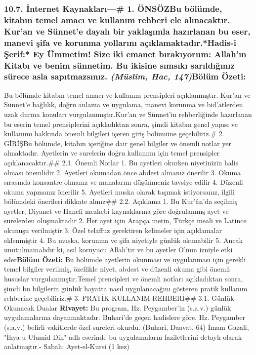 \documentclass[12pt,a4paper]{article}
\begin{document}
\subsubsection{10.7. İnternet Kaynakları---\# 1. ÖNSÖZBu bölümde, kitabın temel amacı ve kullanım rehberi ele alınacaktır. Kur'an ve Sünnet'e dayalı bir yaklaşımla hazırlanan bu eser, manevi şifa ve korunma yollarını açıklamaktadır.*Hadis-i Şerif:* Ey Ümmetim! Size iki emanet bırakıyorum: Allah'ın Kitabı ve benim sünnetim. Bu ikisine sımsıkı sarıldığınız sürece asla sapıtmazsınız. \textit{(Müslim, Hac, 147)}\textbf{Bölüm Özeti:}}
Bu bölümde kitabın temel amacı ve kullanım prensipleri açıklanmıştır. Kur'an ve Sünnet'e bağlılık, doğru anlama ve uygulama, manevi korunma ve bid'atlerden uzak durma konuları vurgulanmıştır.Kur'an ve Sünnet'in rehberliğinde hazırlanan bu eserin temel prensiplerini açıkladıktan sonra, şimdi kitabın genel yapısı ve kullanımı hakkında önemli bilgileri içeren giriş bölümüne geçebiliriz.\# 2. GİRİŞBu bölümde, kitabın içeriğine dair genel bilgiler ve önemli notlar yer almaktadır. Ayetlerin ve surelerin doğru kullanımı için temel prensipler açıklanacaktır.\#\# 2.1. Önemli Notlar
1. Bu ayetleri okurken niyetinizin halis olması önemlidir
2. Ayetleri okumadan önce abdest almanız önerilir
3. Okuma sırasında konsantre olmanız ve manalarını düşünmeniz tavsiye edilir
4. Düzenli okuma yapmanız önerilir
5. Ayetleri muska olarak taşımak istiyorsanız, ilgili bölümdeki önerileri dikkate alınız\#\# 2.2. Açıklama
1. Bu Kur'ân'da seçilmiş ayetler, Diyanet ve Hanefi mezhebi kaynaklarına göre doğrulanmış ayet ve surelerden oluşmaktadır
2. Her ayet için Arapça metin, Türkçe meali ve Latince okunuşu verilmiştir
3. Özel telaffuz gerektiren kelimeler için açıklamalar eklenmiştir
4. Bu muska, korunma ve şifa niyetiyle günlük okunabilir
5. Ancak unutulmamalıdır ki, asıl koruyucu Allah'tır ve bu ayetler O'nun izniyle etki eder\textbf{Bölüm Özeti:}
Bu bölümde ayetlerin okunması ve uygulanması için gerekli temel bilgiler verilmiş, özellikle niyet, abdest ve düzenli okuma gibi önemli hususlar vurgulanmıştır.Temel prensipleri ve önemli notları açıkladıktan sonra, şimdi bu bilgilerin günlük hayatta nasıl uygulanacağını gösteren pratik kullanım rehberine geçebiliriz.\# 3. PRATİK KULLANIM REHBERİ\#\# 3.1. Günlük Okunacak Dualar
\textbf{Rivayet:} Bu program, Hz. Peygamber'in (s.a.v.) günlük uygulamalarına dayanmaktadır. Buhari'de geçen hadislere göre, Hz. Peygamber (s.a.v.) belirli vakitlerde özel sureleri okurdu. (Buhari, Daavat, 64) İmam Gazali, "İhya-u Ulumid-Din" adlı eserinde bu uygulamaların faziletlerini detaylı olarak anlatmıştır.- Sabah: Ayet-el-Kursi (1 kez)
\end{document}
